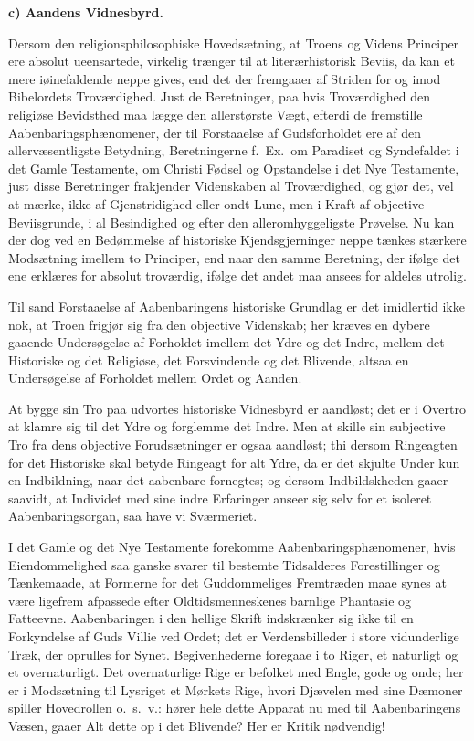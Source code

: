 \documentclass[12pt]{book}
\newcommand{\runhead}[1]{%
  \medskip\begin{center}{\bfseries #1}\end{center}\medskip}
\begin{document}
\runhead{c) Aandens Vidnesbyrd.}

Dersom den religionsphilosophiske Hovedsætning, at Troens og Videns
Principer ere absolut ueensartede, virkelig trænger til at
literærhistorisk Beviis, da kan et mere iøinefaldende neppe gives,
end det der fremgaaer af Striden for og imod Bibelordets
Troværdighed. Just de Beretninger, paa hvis Troværdighed den
religiøse Bevidsthed maa lægge den allerstørste Vægt, efterdi de
fremstille Aabenbaringsphænomener, der til Forstaaelse af
Gudsforholdet ere af den allervæsentligste Betydning,
Beretningerne f.\ Ex.\ om Paradiset og Syndefaldet i det Gamle
Testamente, om Christi Fødsel og Opstandelse i det Nye Testamente,
just disse Beretninger frakjender Videnskaben al Troværdighed, og
gjør det, vel at mærke, ikke af Gjenstridighed eller ondt Lune, men
i Kraft af
objective Beviisgrunde, i al Besindighed og efter den
alleromhyggeligste Prøvelse. Nu kan der dog ved en Bedømmelse af
historiske Kjendsgjerninger neppe tænkes stærkere Modsætning imellem
to Principer, end naar den samme Beretning, der ifølge det ene
erklæres for absolut troværdig, ifølge det andet maa ansees for
aldeles utrolig.

Til sand Forstaaelse af Aabenbaringens historiske Grundlag er det
imidlertid ikke nok, at Troen frigjør sig fra den objective
Videnskab; her kræves en dybere gaaende Undersøgelse af Forholdet
imellem det Ydre og det Indre, mellem det Historiske og det
Religiøse, det Forsvindende og det Blivende, altsaa en Undersøgelse
af Forholdet mellem Ordet og Aanden.

At bygge sin Tro paa udvortes historiske Vidnesbyrd er aandløst; det
er i Overtro at klamre sig til det Ydre og forglemme det Indre. Men
at skille sin subjective Tro fra dens objective Forudsætninger er
ogsaa aandløst; thi dersom Ringeagten for det Historiske skal betyde
Ringeagt for alt Ydre, da er det skjulte Under kun en Indbildning,
naar det aabenbare fornegtes; og dersom Indbildskheden gaaer
saavidt, at Individet med sine indre Erfaringer anseer sig selv for
et isoleret Aabenbaringsorgan, saa have vi Sværmeriet.

I det Gamle og det Nye Testamente forekomme
Aabenbaringsphænomener, hvis Eiendommelighed saa ganske svarer til
bestemte Tidsalderes Forestillinger og Tænkemaade, at Formerne for
det Guddommeliges Fremtræden maae synes at være ligefrem afpassede
efter Oldtidsmenneskenes barnlige Phantasie og Fatteevne.
Aabenbaringen i den hellige Skrift indskrænker sig ikke til en
Forkyndelse af Guds Villie ved Ordet; det er Verdensbilleder i store
vidunderlige Træk, der oprulles for Synet. Begivenhederne foregaae i
to Riger, et naturligt og et overnaturligt. Det overnaturlige Rige
er befolket med Engle,
gode og onde; her er i Modsætning til Lysriget et Mørkets Rige,
hvori Djævelen med sine Dæmoner spiller Hovedrollen o.\ s.\ v.:
hører hele dette Apparat nu med til Aabenbaringens Væsen, gaaer Alt
dette op i det Blivende? Her er Kritik nødvendig!
\end{document}
